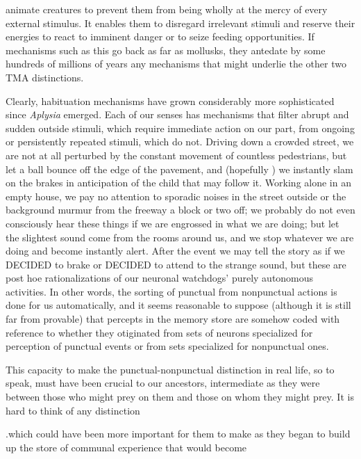 
animate creatures to prevent them from being wholly at the mercy of every external stimulus. It enables them to disregard irrelevant stimuli and reserve their energies to react to imminent danger or to seize feeding opportunities. If mechanisms such as this go back as far as mollusks, they antedate by some hundreds of millions of years any mechanisms that might underlie the other two TMA distinctions.

Clearly, habituation mechanisms have grown considerably more sophisticated since \textit{Aplysia} emerged. Each of our senses has mechanisms that filter abrupt and sudden outside stimuli, which require immediate action on our part, from ongoing or persistently repeated stimuli, which do not. Driving down a crowded street, we are not at all perturbed by the constant movement of countless pedestrians, but let a ball bounce off the edge of the pavement, and (hopefully ) we instantly slam on the brakes in anticipation of the child that may follow it. Working alone in an empty house, we pay no attention to sporadic noises in the street outside or the background murmur from the freeway a block or two off; we probably do not even consciously hear these things if we are engrossed in what we are doing; but let the slightest sound come from the rooms around us, and we stop whatever we are doing and become instantly alert. After the event we may tell the story as if we DECIDED to brake or DECIDED to attend to the strange sound, but these are post hoe rationalizations of our neuronal watchdogs' purely autono\-mous activities. In other words, the sorting of punctual from non\-punctual actions is done for us automatically, and it seems reasonable to suppose (although it is still far from provable) that percepts in the memory store are somehow coded with reference to whether they otiginated from sets of neurons specialized for perception of punctual events or from sets specialized for nonpunctual ones.

This capacity to make the punctual-nonpunctual distinction in real life, so to speak, must have been crucial to our ancestors, inter\-mediate as they were between those who might prey on them and those on whom they might prey. It is hard to think of any distinction

.which could have been more important for them to make as they began to build up the store of communal experience that would become


